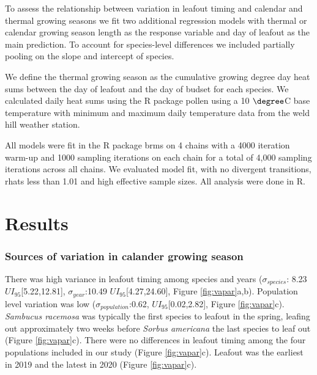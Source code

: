\documentclass[12 pt]{article}
\begin{document}
To assess the relationship between variation in leafout timing and calendar and thermal growing seasons we fit two additional regression models with thermal or calendar growing season length as the response variable and day of leafout as the main prediction. To account for species-level differences we included partially pooling on the slope and intercept of species.

We define the thermal growing season as the cumulative growing degree day heat sums between the day of leafout and the day of budset for each species. We calculated daily heat sums using the R package pollen \citep{} using a 10 $\degree$C base temperature with minimum and maximum daily temperature data from the weld hill weather station.

All models were fit in the R package brms on 4 chains with a 4000 iteration warm-up and 1000 sampling iterations on each chain for a total of 4,000 sampling iterations across all chains. We evaluated model fit, with no divergent transitions, rhats less than 1.01 and high effective sample sizes. All analysis were done in R.

\section{Results} %
\subsubsection{Sources of variation in calander growing season}
There was high variance in leafout timing among species and years ($\sigma_{species}$: 8.23 $UI_{95}$[5.22,12.81], $\sigma_{year}$:10.49 $UI_{95}$[4.27,24.60], Figure \ref{fig:vapar}a,b). Population level variation was low ($\sigma_{population}$:0.62, $UI_{95}$[0.02,2.82], Figure \ref{fig:vapar}c). \emph{Sambucus racemosa} was typically the first species to leafout in the spring, leafing out approximately two weeks before \emph{Sorbus americana} the last species to leaf out (Figure \ref{fig:vapar}c). There were no differences in leafout timing among the four populations included in our study (Figure \ref{fig:vapar}c). Leafout was the earliest in 2019 and the latest in 2020 (Figure \ref{fig:vapar}c). 
\end{document}
